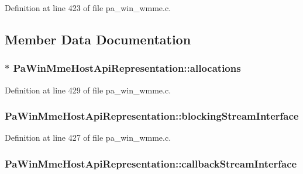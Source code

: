 Definition at line 423 of file pa\+\_\+win\+\_\+wmme.\+c.



\subsection{Member Data Documentation}
\subsubsection[{\texorpdfstring{allocations}{allocations}}]{$\ast$ Pa\+Win\+Mme\+Host\+Api\+Representation\+::allocations}\hypertarget{struct_pa_win_mme_host_api_representation_a27118f61b075ffae1e2f4d95cc97c4ac}{}\label{struct_pa_win_mme_host_api_representation_a27118f61b075ffae1e2f4d95cc97c4ac}


Definition at line 429 of file pa\+\_\+win\+\_\+wmme.\+c.

\subsubsection[{\texorpdfstring{blocking\+Stream\+Interface}{blockingStreamInterface}}]{ Pa\+Win\+Mme\+Host\+Api\+Representation\+::blocking\+Stream\+Interface}\hypertarget{struct_pa_win_mme_host_api_representation_a641c060de956bd991dd145296bbbca57}{}\label{struct_pa_win_mme_host_api_representation_a641c060de956bd991dd145296bbbca57}


Definition at line 427 of file pa\+\_\+win\+\_\+wmme.\+c.

\subsubsection[{\texorpdfstring{callback\+Stream\+Interface}{callbackStreamInterface}}]{ Pa\+Win\+Mme\+Host\+Api\+Representation\+::callback\+Stream\+Interface}\hypertarget{struct_pa_win_mme_host_api_representation_a8baac4cae76ba97cd1d18453814556e7}{}\label{struct_pa_win_mme_host_api_representation_a8baac4cae76ba97cd1d18453814556e7}


